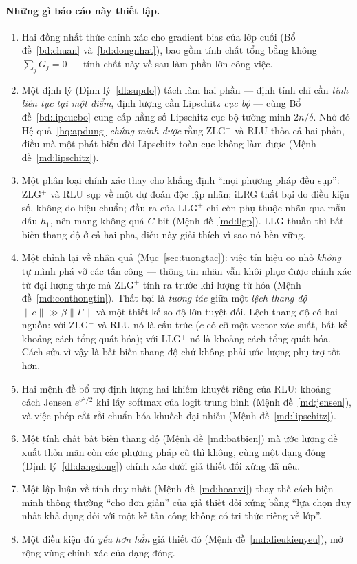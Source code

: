 \documentclass[11pt]{article}
\theoremstyle{remark}
\begin{document}
\paragraph{Những gì báo cáo này thiết lập.}
\begin{enumerate}
\item Hai đồng nhất thức chính xác cho gradient bias của lớp cuối
  (Bổ đề~\ref{bd:chuan} và~\ref{bd:dongnhat}), bao gồm tính chất tổng bằng
  không $\sum_j G_j = 0$ --- tính chất này về sau làm phần lớn công việc.
\item Một định lý (Định lý~\ref{dl:supdo}) tách làm hai phần --- định tính
  chỉ cần \emph{tính liên tục tại một điểm}, định lượng cần Lipschitz
  \emph{cục bộ} --- cùng Bổ đề~\ref{bd:lipcucbo} cung cấp hằng số Lipschitz
  cục bộ tường minh $2n/\delta$. Nhờ đó Hệ quả~\ref{hq:apdung} \emph{chứng
  minh được} rằng ZLG$^+$ và RLU thỏa cả hai phần, điều mà một phát biểu đòi
  Lipschitz toàn cục không làm được (Mệnh đề~\ref{md:lipschitz}).
\item Một phân loại chính xác thay cho khẳng định ``mọi phương pháp đều sụp'':
  ZLG$^+$ và RLU sụp về một dự đoán độc lập nhãn; iLRG thất bại do điều kiện
  số, không do hiệu chuẩn; đầu ra của LLG$^+$ chỉ còn phụ thuộc nhãn qua mẫu
  dấu $h_1$, nên mang không quá $C$ bit (Mệnh đề~\ref{md:llgp}). LLG thuần thì
  bất biến thang độ ở cả hai pha, điều này giải thích vì sao nó bền vững.
\item Một chỉnh lại về nhân quả (Mục~\ref{sec:tuongtac}): việc tín hiệu co nhỏ
  \emph{không} tự mình phá vỡ các tấn công --- thông tin nhãn vẫn khôi phục
  được chính xác từ đại lượng thực mà ZLG$^+$ tính ra trước khi lượng tử hóa
  (Mệnh đề~\ref{md:conthongtin}). Thất bại là \emph{tương tác} giữa một
  \emph{lệch thang độ} $\|c\|\gg\beta\|\Gamma\|$ và một thiết kế so độ lớn
  tuyệt đối. Lệch thang độ có hai nguồn: với ZLG$^+$ và RLU nó là cấu trúc
  ($c$ có cỡ một vector xác suất, bất kể khoảng cách tổng quát hóa); với
  LLG$^+$ nó là khoảng cách tổng quát hóa. Cách sửa vì vậy là bất biến thang
  độ chứ không phải ước lượng phụ trợ tốt hơn.
\item Hai mệnh đề bổ trợ định lượng hai khiếm khuyết riêng của RLU: khoảng
  cách Jensen $e^{\sigma^2/2}$ khi lấy softmax của logit trung bình
  (Mệnh đề~\ref{md:jensen}), và việc phép cắt-rồi-chuẩn-hóa khuếch đại nhiễu
  (Mệnh đề~\ref{md:lipschitz}).
\item Một tính chất bất biến thang độ (Mệnh đề~\ref{md:batbien}) mà ước lượng
  đề xuất thỏa mãn còn các phương pháp cũ thì không, cùng một dạng đóng
  (Định lý~\ref{dl:dangdong}) chính xác dưới giả thiết đối xứng đã nêu.
\item Một lập luận về tính duy nhất (Mệnh đề~\ref{md:hoanvi}) thay thế cách
  biện minh thông thường ``cho đơn giản'' của giả thiết đối xứng bằng ``lựa
  chọn duy nhất khả dụng đối với một kẻ tấn công không có tri thức riêng về
  lớp''.
\item Một điều kiện đủ \emph{yếu hơn hẳn} giả thiết đó
  (Mệnh đề~\ref{md:dieukienyeu}), mở rộng vùng chính xác của dạng đóng.
\end{enumerate}
\end{document}
